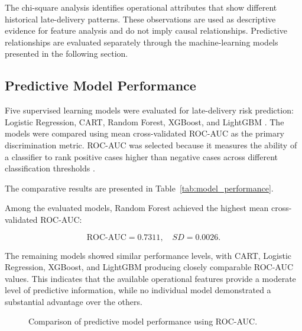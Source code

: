 \documentclass[manuscript, screen, review]{acmart}
\begin{document}
The chi-square analysis identifies operational attributes that show
different historical late-delivery patterns. These observations are
used as descriptive evidence for feature analysis and do not imply
causal relationships. Predictive relationships are evaluated separately
through the machine-learning models presented in the following section.

\subsection{Predictive Model Performance}

Five supervised learning models were evaluated for late-delivery risk
prediction: Logistic Regression, CART, Random Forest, XGBoost, and
LightGBM \cite{breiman1984classification,breiman2001random,chen2016xgboost,ke2017lightgbm}.
The models were compared using mean cross-validated ROC-AUC as the
primary discrimination metric. ROC-AUC was selected because it measures
the ability of a classifier to rank positive cases higher than negative
cases across different classification thresholds \cite{fawcett2006introduction}.

The comparative results are presented in Table~\ref{tab:model_performance}.

\begin{table}[htbp]
\centering
\caption{Predictive Model Performance}
\label{tab:model_performance}

\end{table}

Among the evaluated models, Random Forest achieved the highest mean
cross-validated ROC-AUC:

\[
\text{ROC-AUC}=0.7311,\quad SD=0.0026.
\]

The remaining models showed similar performance levels, with CART,
Logistic Regression, XGBoost, and LightGBM producing closely comparable
ROC-AUC values. This indicates that the available operational features
provide a moderate level of predictive information, while no individual
model demonstrated a substantial advantage over the others.

\begin{figure}[htbp]
\centering

\caption{Comparison of predictive model performance using ROC-AUC.}
\label{fig:model_comparison}
\end{figure}
\end{document}

